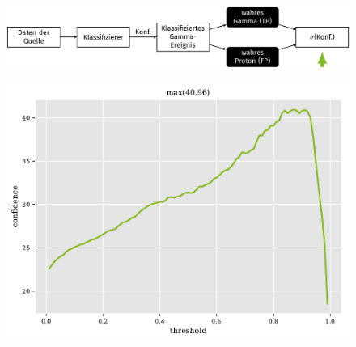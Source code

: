 \documentclass[aspectratio=1610, professionalfonts, 9pt]{beamer}
\begin{document}
\begin{frame}
  \begin{minipage}[t][0.3\textheight][t]{\textwidth}
	\begin{figure}
	  \includegraphics[scale=0.5]{./tikz/Conf/Conf4.pdf}
	\end{figure}
  \end{minipage}
  \begin{minipage}[t][0.7\textheight][t]{\textwidth}
	\begin{figure}
	  \centering
	  \includegraphics[height=0.6\textheight]{./Plots/significance_monte.pdf}
	\end{figure}
  \end{minipage}
\end{frame}
\end{document}
